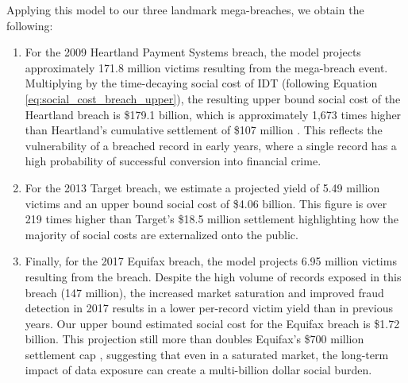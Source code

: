 Applying this model to our three landmark mega-breaches, we obtain the following: 
\begin{enumerate}
\item For the 2009 Heartland Payment Systems breach, the model projects approximately 171.8 million victims resulting from the mega-breach event. Multiplying by the time-decaying social cost of IDT (following Equation \ref{eq:social_cost_breach_upper}), the resulting upper bound social cost of the Heartland breach is \$179.1 billion, which is approximately 1,673 times higher than Heartland's cumulative settlement of \$107 million \cite{heartland_amex_2009, heartland_mastercard_2010, heartland_visa_2010, heartland_consumer_2012}.  This reflects the vulnerability of a breached record in early years, where a single record has a high probability of successful conversion into financial crime. 

\item For the 2013 Target breach, we estimate a projected yield of 5.49 million victims and an upper bound social cost of \$4.06 billion. This figure is over 219 times higher than Target's \$18.5 million settlement \cite{TexasAG_TargetSettlement} highlighting how the majority of social costs are externalized onto the public. 



\item 
Finally, for the 2017 Equifax breach, the model projects 6.95 million victims resulting from the breach. Despite the high volume of records exposed in this breach (147 million), the increased market saturation and improved fraud detection in 2017 results in a lower per-record victim yield than in previous years. Our upper bound estimated social cost for the Equifax breach is \$1.72 billion. This projection still more than doubles Equifax's \$700 million settlement cap \cite{FTC_EquifaxSettlement}, suggesting that even in a saturated market, the long-term impact of data exposure can create a multi-billion dollar social burden.



\end{enumerate}

